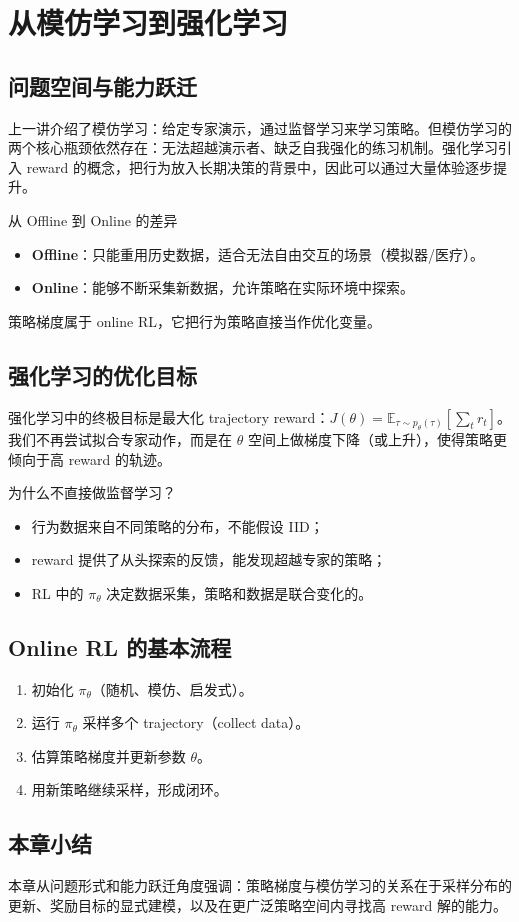\section{从模仿学习到强化学习}

\subsection{问题空间与能力跃迁}

上一讲介绍了模仿学习：给定专家演示，通过监督学习来学习策略。但模仿学习的两个核心瓶颈依然存在：无法超越演示者、缺乏自我强化的练习机制。强化学习引入 reward 的概念，把行为放入长期决策的背景中，因此可以通过大量体验逐步提升。

\begin{knowledgebox}{从 Offline 到 Online 的差异}
\begin{itemize}
    \item \textbf{Offline}：只能重用历史数据，适合无法自由交互的场景（模拟器/医疗）。
    \item \textbf{Online}：能够不断采集新数据，允许策略在实际环境中探索。
\end{itemize}
策略梯度属于 online RL，它把行为策略直接当作优化变量。
\end{knowledgebox}

\subsection{强化学习的优化目标}

强化学习中的终极目标是最大化 trajectory reward：$J(\theta) = \mathbb{E}_{\tau \sim p_\theta(\tau)} [\sum_t r_t]$。我们不再尝试拟合专家动作，而是在 $\theta$ 空间上做梯度下降（或上升），使得策略更倾向于高 reward 的轨迹。

\begin{importantbox}{为什么不直接做监督学习？}
\begin{itemize}
    \item 行为数据来自不同策略的分布，不能假设 IID；
    \item reward 提供了从头探索的反馈，能发现超越专家的策略；
    \item RL 中的 $\pi_\theta$ 决定数据采集，策略和数据是联合变化的。
\end{itemize}
\end{importantbox}

\subsection{Online RL 的基本流程}

\begin{enumerate}
    \item 初始化 $\pi_\theta$（随机、模仿、启发式）。
    \item 运行 $\pi_\theta$ 采样多个 trajectory（collect data）。
    \item 估算策略梯度并更新参数 $\theta$。
    \item 用新策略继续采样，形成闭环。
\end{enumerate}

\subsection{本章小结}

本章从问题形式和能力跃迁角度强调：策略梯度与模仿学习的关系在于采样分布的更新、奖励目标的显式建模，以及在更广泛策略空间内寻找高 reward 解的能力。

